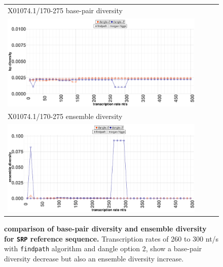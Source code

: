 \documentclass[ twoside,openright,titlepage,numbers=noenddot,headinclude,%
                footinclude=false, cleardoublepage=empty,abstractoff, %
                BCOR=5mm,paper=a4,fontsize=11pt,%
                ngerman,american,%
                ]{scrreprt}
\begin{document}
\begin{figure}
\begin{tabular}{l}
X01074.1/170-275 base-pair diversity\\
\includegraphics[width=0.9\textwidth]{./pictures/basePairDiversity/TimeDepended/SRPWithTime.pdf}\\
X01074.1/170-275 ensemble diversity\\
\includegraphics[width=0.9\textwidth]{./pictures/ensembleDiversity/SRP2510.pdf}\\
\end{tabular}
\caption{{\bf comparison of base-pair diversity and ensemble diversity for \texttt{SRP} reference sequence.}
Transcription rates of 260 to 300 nt/s with \texttt{findpath} algorithm and dangle option 2, show a base-pair diversity decrease but also an ensemble diversity increase.}
\label{fig:comparison_SRPensemblediversity_bpdiversity}
\end{figure}
\FloatBarrier\
\end{document}
